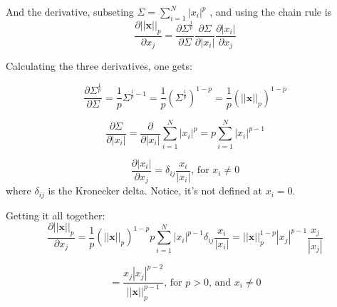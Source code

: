 \documentclass{article}
\begin{document}
And the derivative, subseting  $\Sigma = {\sum_{i=1}^{N} |x_i|^p}$ , and using the chain rule is
\begin{equation}
     \label{21}
    \frac{\partial || \mathbf{x} ||_p }{\partial x_j} = \frac{\partial \Sigma ^{\frac{1}{p}}}{\partial \Sigma} \frac{\partial \Sigma}{\partial |x_i|} \frac{\partial |x_i|}{\partial x_j}
\end{equation}

Calculating the three derivatives, one gets:

\begin{equation}
     \label{22}
 \frac{\partial \Sigma ^{\frac{1}{p}}}{\partial \Sigma} = \frac{1}{p} \Sigma ^{\frac{1}{p}-1} = \frac{1}{p} (\Sigma ^{\frac{1}{p}})^{1-p} =  \frac{1}{p} (|| \mathbf{x} ||_p)^{1-p}
\end{equation}

\begin{equation}
     \label{23}
\frac{\partial \Sigma}{\partial |x_i|} = \frac{\partial}{\partial |x_i|} {\sum_{i=1}^{N} |x_i|^p} = p {\sum_{i=1}^{N} |x_i|^{p-1}}
\end{equation}

\begin{equation}
     \label{24}
\frac{\partial |x_i|}{\partial x_j} = \delta _{ij} \frac{x_i}{|x_i|} \text{, for } x_i \neq 0 
\end{equation}
where $\delta _{ij}$ is the Kronecker delta. Notice, it's not defined at $x_i=0$.

Getting it all together:
\begin{equation}
     \label{25}
\frac{\partial || \mathbf{x} ||_p }{\partial x_j} = \frac{1}{p} (|| \mathbf{x} ||_p)^{1-p} p {\sum_{i=1}^{N} |x_i|^{p-1}} \delta _{ij} \frac{x_i}{ |x_i|} = || \mathbf{x} ||_p^{1-p}  |x_j|^{p-1} \frac{x_j}{|x_j|}  
\end{equation}

\begin{equation}
     \label{25}
= \frac{x_j |x_j|^{p-2}}{|| \mathbf{x} ||_p^{p-1}}    \text{, for } p > 0 \text{, and } x_i \neq 0 
\end{equation}
\end{document}
